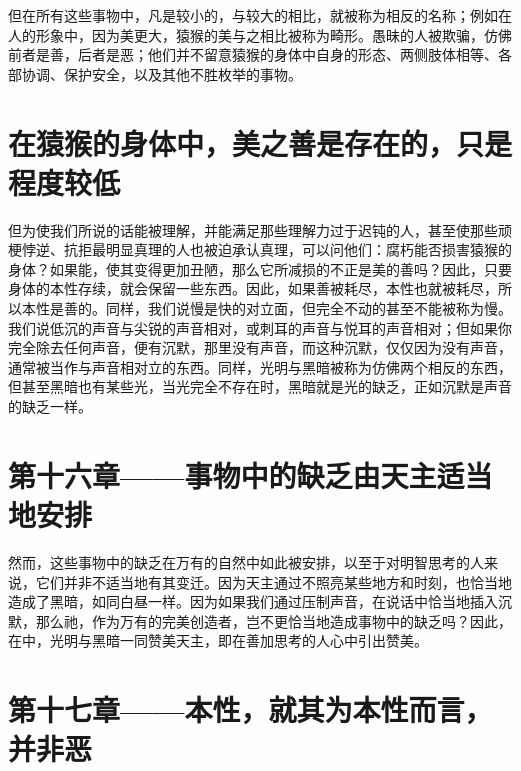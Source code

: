 但在所有这些事物中，凡是较小的，与较大的相比，就被称为相反的名称；例如在人的形象中，因为美更大，猿猴的美与之相比被称为畸形。愚昧的人被欺骗，仿佛前者是善，后者是恶；他们并不留意猿猴的身体中自身的形态、两侧肢体相等、各部协调、保护安全，以及其他不胜枚举的事物。\par


\section{在猿猴的身体中，美之善是存在的，只是程度较低}

但为使我们所说的话能被理解，并能满足那些理解力过于迟钝的人，甚至使那些顽梗悖逆、抗拒最明显真理的人也被迫承认真理，可以问他们：腐朽能否损害猿猴的身体？如果能，使其变得更加丑陋，那么它所减损的不正是美的善吗？因此，只要身体的本性存续，就会保留一些东西。因此，如果善被耗尽，本性也就被耗尽，所以本性是善的。同样，我们说慢是快的对立面，但完全不动的甚至不能被称为慢。我们说低沉的声音与尖锐的声音相对，或刺耳的声音与悦耳的声音相对；但如果你完全除去任何声音，便有沉默，那里没有声音，而这种沉默，仅仅因为没有声音，通常被当作与声音相对立的东西。同样，光明与黑暗被称为仿佛两个相反的东西，但甚至黑暗也有某些光，当光完全不存在时，黑暗就是光的缺乏，正如沉默是声音的缺乏一样。\par


\section{第十六章——事物中的缺乏由天主适当地安排}

然而，这些事物中的缺乏在万有的自然中如此被安排，以至于对明智思考的人来说，它们并非不适当地有其变迁。因为天主通过不照亮某些地方和时刻，也恰当地造成了黑暗，如同白昼一样。因为如果我们通过压制声音，在说话中恰当地插入沉默，那么祂，作为万有的完美创造者，岂不更恰当地造成事物中的缺乏吗？因此，在中，光明与黑暗一同赞美天主，即在善加思考的人心中引出赞美。\par


\section{第十七章——本性，就其为本性而言，并非恶}

